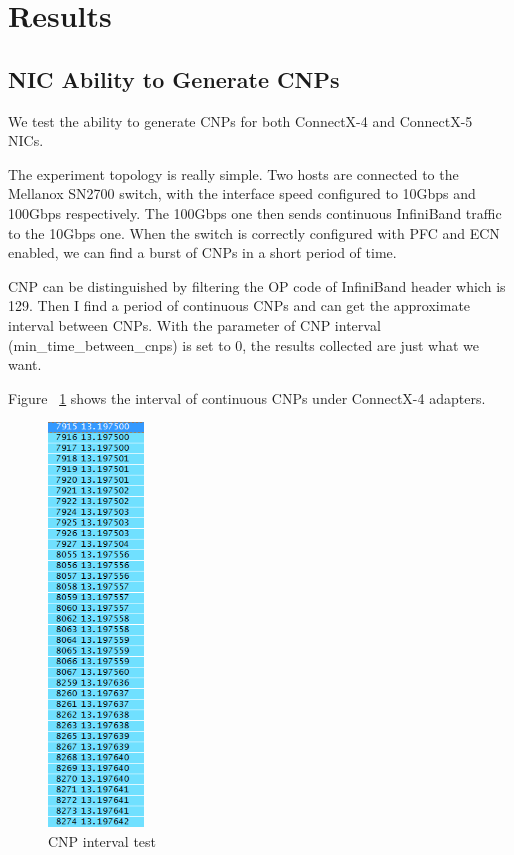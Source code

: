 \documentclass[12pt,a4paper]{article}
\begin{document}
\newpage
\section{Results}

\subsection{NIC Ability to Generate CNPs}
We test the ability to generate CNPs for both ConnectX-4 and ConnectX-5 NICs.

The experiment topology is really simple.
Two hosts are connected to the Mellanox SN2700 switch, with the interface speed configured to 10Gbps and 100Gbps respectively.
The 100Gbps one then sends continuous InfiniBand traffic to the 10Gbps one.
When the switch is correctly configured with PFC and ECN enabled, we can find a burst of CNPs in a short period of time.

CNP can be distinguished by filtering the OP code of InfiniBand header which is 129.
Then I find a period of continuous CNPs and can get the approximate interval between CNPs.
With the parameter of CNP interval (min\_time\_between\_cnps) is set to 0, the results collected are just what we want.

Figure ~\ref{fig:CNPint} shows the interval of continuous CNPs under ConnectX-4 adapters.

\begin{figure}[h!]
	\begin{center}
		\includegraphics[width=1in]{CNPint}
		\caption{CNP interval test}
		\label{fig:CNPint}
	\end{center}
\end{figure}
\end{document}
